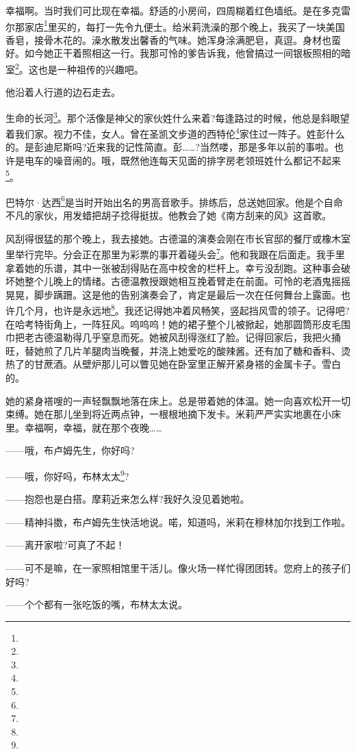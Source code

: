 \par 幸福啊。当时我们可比现在幸福。舒适的小房间，四周糊着红色墙纸。是在多克雷尔那家店\footnote{}里买的，每打一先令九便士。给米莉洗澡的那个晚上，我买了一块美国香皂，接骨木花的。澡水散发出馨香的气味。她浑身涂满肥皂，真逗。身材也蛮好。如今她正干着照相这一行。我那可怜的爹告诉我，他曾搞过一间银板照相的暗室\footnote{}。这也是一种祖传的兴趣吧。
\par 他沿着人行道的边石走去。
\par 生命的长河\footnote{}。那个活像是神父的家伙姓什么来着?每逢路过的时候，他总是斜眼望着我们家。视力不佳，女人。曾在圣凯文步道的西特伦\footnote{}家住过一阵子。姓彭什么的。是彭迪尼斯吗?近来我的记性简直。彭……?当然喽，那是多年以前的事啦。也许是电车的噪音闹的。哦，既然他连每天见面的排字房老领班姓什么都记不起来\footnote{}。
\par 巴特尔·达西\footnote{}是当时开始出名的男高音歌手。排练后，总送她回家。他是个自命不凡的家伙，用发蜡把胡子捻得挺拔。他教会了她《南方刮来的风》这首歌。
\par 风刮得很猛的那个晚上，我去接她。古德温的演奏会刚在市长官邸的餐厅或橡木室里举行完毕。分会正在那里为彩票的事开着碰头会\footnote{}。他和我跟在后面走。我手里拿着她的乐谱，其中一张被刮得贴在高中校舍的栏杆上。幸亏没刮跑。这种事会破坏她整个儿晚上的情绪。古德温教授跟她相互挽着臂走在前面。可怜的老酒鬼摇摇晃晃，脚步蹒跚。这是他的告别演奏会了，肯定是最后一次在任何舞台上露面。也许几个月，也许是永远地\footnote{}。我还记得她冲着风畅笑，竖起挡风雪的领子。记得吧?在哈考特街角上，一阵狂风。呜呜呜！她的裙子整个儿被掀起，她那圆筒形皮毛围巾把老古德温勒得几乎窒息而死。她被风刮得涨红了脸。记得回家后，我把火捅旺，替她煎了几片羊腿肉当晚餐，并浇上她爱吃的酸辣酱。还有加了糖和香料、烫热了的甘蔗酒。从壁炉那儿可以瞥见她在卧室里正解开紧身褡的金属卡子。雪白的。
\par 她的紧身褡嗖的一声轻飘飘地落在床上。总是带着她的体温。她一向喜欢松开一切束缚。她在那儿坐到将近两点钟，一根根地摘下发卡。米莉严严实实地裹在小床里。幸福啊，幸福，就在那个夜晚……
\par ——哦，布卢姆先生，你好吗?
\par ——哦，你好吗，布林太太\footnote{}?
\par ——抱怨也是白搭。摩莉近来怎么样?我好久没见着她啦。
\par ——精神抖擞，布卢姆先生快活地说。喏，知道吗，米莉在穆林加尔找到工作啦。
\par ——离开家啦?可真了不起！
\par ——可不是嘛，在一家照相馆里干活儿。像火场一样忙得团团转。您府上的孩子们好吗?
\par ——个个都有一张吃饭的嘴，布林太太说。
